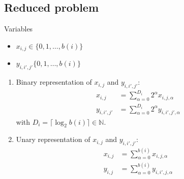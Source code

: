 \documentclass{article}
\begin{document}
\subsection{Reduced problem}
Variables
\begin{itemize}
    \item $x_{i, j} \in \{0, 1, \dots, b(i)\}$
    \item $y_{i, i', j'} \{0, 1, \dots, b(i)\}$
\end{itemize}
\begin{enumerate}
    \item 
    Binary representation of $x_{i, j}$ and $y_{i, i', j'}$:
    \begin{align*}
        x_{i, j} & = \sum_{\alpha = 0}^{D_i} 2^\alpha x_{i, j, \alpha} \\
        y_{i, i', j'} & = \sum_{\alpha = 0}^{D_i} 2^\alpha y_{i, i', j', \alpha}
    \end{align*}
    with $D_i = \lceil \log_2 b(i) \rceil \in \mathbb{N}$.
    \item 
    Unary representation of $x_{i, j}$ and $y_{i, i', j'}$:
    \begin{align*}
        x_{i, j} & = \sum_{\alpha = 0}^{b(i)} x_{i, j, \alpha} \\
        y_{i, j} & = \sum_{\alpha = 0}^{b(i)} y_{i, i', j, \alpha} \\
    \end{align*}
\end{enumerate}
\end{document}

